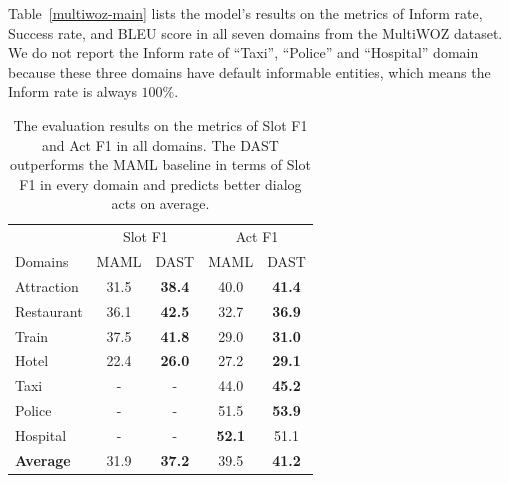 \documentclass[letterpaper]{article} %
\begin{document}
%
Table~\ref{multiwoz-main} lists the model's results on the metrics of Inform rate, Success rate, and BLEU score in all seven domains from the MultiWOZ dataset. We do not report the Inform rate of ``Taxi'', ``Police'' and ``Hospital'' domain because these three domains have default informable entities, which means the Inform rate is always $100\%$.
%
%


\begin{table}[ht!]
\centering
\setlength{\extrarowheight}{0.06cm}
\small
\begin{tabular}[width=\columnwidth]{l|cccc}
\toprule
\hline
& \multicolumn{2}{c}{Slot F1} & \multicolumn{2}{c}{Act F1}\\
\cmidrule(lr){2-3} \cmidrule(lr){4-5}
Domains  &MAML& DAST &MAML& DAST  \\
\hline
Attraction & 31.5                 & \textbf{38.4}                 & 40.0                 & \textbf{41.4}  \\
\hline
Restaurant & 36.1                 & \textbf{42.5 }                & 32.7                 & \textbf{36.9}  \\
\hline
Train     & 37.5                 & \textbf{41.8}                 & 29.0                 & \textbf{31.0}\\
\hline
Hotel& 22.4                 & \textbf{26.0}                 & 27.2                 & \textbf{29.1} \\
\hline
Taxi & -                & -               & 44.0                 & \textbf{45.2}                  \\
\hline
Police & -                 &-                & 51.5                 & \textbf{53.9 }                 \\
\hline
Hospital&-         & -      & \textbf{52.1}   & 51.1  \\
\hline
\textbf{Average}  & 31.9    & \textbf{37.2}  & 39.5   & \textbf{41.2}\\
\hline
\bottomrule
\end{tabular}
\caption{The evaluation results on the metrics of Slot F1 and Act F1 in all domains. The DAST outperforms the MAML baseline in terms of Slot F1 in every domain and predicts better dialog acts on average. }
\label{multiwoz_slot}
\end{table}
\end{document}
